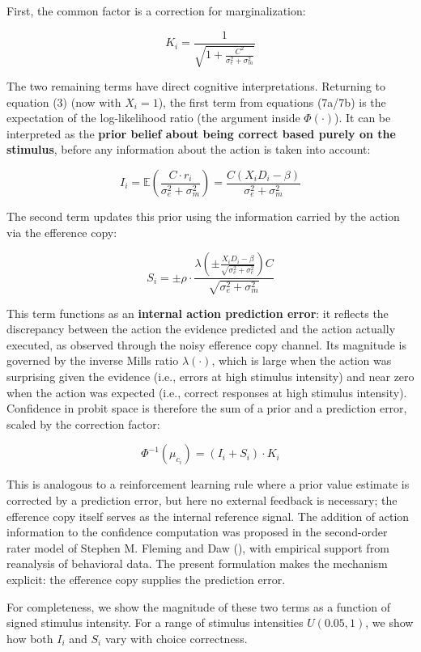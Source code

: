 \documentclass[
]{article}
\begin{document}
First, the common factor is a correction for marginalization:

\[
K_i = \frac{1}{\sqrt{1 + \frac{C^2}{\sigma_e^2+\sigma_m^2}}}
\]

The two remaining terms have direct cognitive interpretations. Returning
to equation (3) (now with \(X_i = 1\)), the first term from equations
(7a/7b) is the expectation of the log-likelihood ratio (the argument
inside \(\Phi(\cdot)\)). It can be interpreted as the \textbf{prior
belief about being correct based purely on the stimulus}, before any
information about the action is taken into account:

\[
I_i = \mathbb{E}\left(\frac{C \cdot r_i}{\sigma_e^2 + \sigma_m^2}\right) = \frac{C(X_iD_i - \beta)}{\sigma_e^2 + \sigma_m^2}
\]

The second term updates this prior using the information carried by the
action via the efference copy:

\[
S_i = \pm\rho \cdot \frac{\lambda\left(\pm\frac{X_iD_i - \beta}{\sqrt{\sigma_e^2 + \sigma_c^2}}\right)C}{\sqrt{\sigma_e^2 + \sigma_m^2}}
\]

This term functions as an \textbf{internal action prediction error}: it
reflects the discrepancy between the action the evidence predicted and
the action actually executed, as observed through the noisy efference
copy channel. Its magnitude is governed by the inverse Mills ratio
\(\lambda(\cdot)\), which is large when the action was surprising given
the evidence (i.e., errors at high stimulus intensity) and near zero
when the action was expected (i.e., correct responses at high stimulus
intensity). Confidence in probit space is therefore the sum of a prior
and a prediction error, scaled by the correction factor:

\[
\Phi^{-1}(\mu_{c_i}) = (I_i + S_i) \cdot K_i
\]

This is analogous to a reinforcement learning rule where a prior value
estimate is corrected by a prediction error, but here no external
feedback is necessary; the efference copy itself serves as the internal
reference signal. The addition of action information to the confidence
computation was proposed in the second-order rater model of Stephen M.
Fleming and Daw
(),
with empirical support from reanalysis of behavioral data. The present
formulation makes the mechanism explicit: the efference copy supplies
the prediction error.

For completeness, we show the magnitude of these two terms as a function
of signed stimulus intensity. For a range of stimulus intensities
\(U(0.05,1)\), we show how both \(I_i\) and \(S_i\) vary with choice
correctness.
\end{document}
